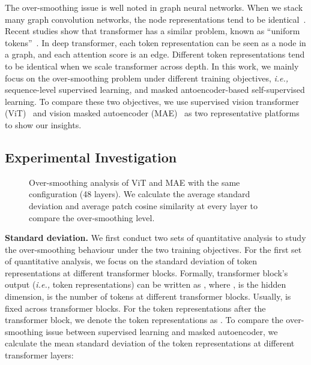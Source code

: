 \documentclass{article}
\theoremstyle{plain}
\theoremstyle{definition}
\theoremstyle{remark}
\newcommand{\ie}{\emph{i.e.,}\xspace}
\begin{document}
The over-smoothing issue is well noted in graph neural networks. When we stack many graph convolution networks, the node representations tend to be identical~\citep{chen2020measuring}. Recent studies show that transformer has a similar problem, known as ``uniform tokens''~\citep{shi2021revisiting}. In deep transformer, each token representation can be seen as a node in a graph, and each attention score is an edge. Different token representations tend to be identical when we scale transformer across depth. In this work, we mainly focus on the over-smoothing problem under different training objectives, \ie sequence-level supervised learning, and masked antoencoder-based self-supervised learning. To compare these two objectives, we use supervised vision transformer (ViT)~\citep{dosovitskiy2020image} and vision masked autoencoder (MAE)~\citep{he2021masked} as two representative platforms to show our insights. 




\subsection{Experimental Investigation}\label{sec: experimental investigation}


\begin{figure}[t]

\centering
{}\vspace{-0.4cm}
\vspace{-0.35cm}
\caption{Over-smoothing analysis of ViT and MAE  with the same configuration (48 layers). We calculate the average standard deviation and average patch cosine similarity at every layer to compare the over-smoothing level.}
\label{fig:over-smoothing}
\vspace{-0.4cm}
\end{figure}


\textbf{Standard deviation.} We first conduct two sets of quantitative analysis to study the over-smoothing behaviour under the two training objectives. For the first set of quantitative analysis, we focus on the standard deviation of token representations at different transformer blocks. Formally, transformer block's output (\ie token representations) can be written as , where ,  is the hidden dimension,  is the number of tokens at different transformer blocks. Usually,  is fixed across transformer blocks. For the token representations after the  transformer block, we denote the token representations as . To compare the over-smoothing issue between supervised learning and masked autoencoder, we calculate the mean standard deviation of the token representations at different transformer layers:
\end{document}

